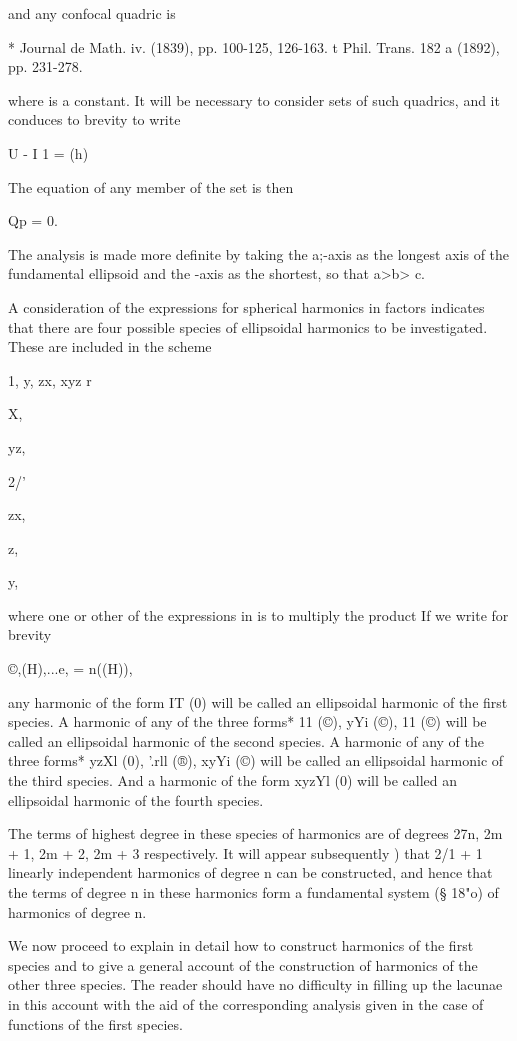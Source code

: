 and any confocal quadric is

* Journal de Math. iv. (1839), pp. 100-125, 126-163. t Phil. Trans.
182 a (1892), pp. 231-278.

%
%

where is a constant. It will be necessary to consider sets of such
quadrics, and it conduces to brevity to write

U - I 1 = (h)

The equation of any member of the set is then

Qp = 0.

The analysis is made more definite by taking the a;-axis as the
longest axis of the fundamental ellipsoid and the -axis as the
shortest, so that a>b> c.


A consideration of the expressions for spherical harmonics in factors
indicates that there are four possible species of ellipsoidal
harmonics to be investigated. These are included in the scheme

1, y, zx, xyz r%

X,

yz,

2/'

zx,

z,

 y,

where one or other of the expressions in is to multiply the product If
we write for brevity

©,(H),...e, = n((H)),

any harmonic of the form IT (0) will be called an ellipsoidal harmonic
of the first species. A harmonic of any of the three forms* 11 (©),
yYi (©), 11 (©) will be called an ellipsoidal harmonic of the second
species. A harmonic of any of the three forms* yzXl (0), '.rll (®),
xyYi (©) will be called an ellipsoidal harmonic of the third species.
And a harmonic of the form xyzYl (0) will be called an ellipsoidal
harmonic of the fourth species.

The terms of highest degree in these species of harmonics are of
degrees 27n, 2m + 1, 2m + 2, 2m + 3 respectively. It will appear
subsequently ) that 2/1 + 1 linearly independent harmonics of
degree n can be constructed, and hence that the terms of degree n in
these harmonics form a fundamental system (§ 18"o) of harmonics of
degree n.

We now proceed to explain in detail how to construct harmonics of the
first species and to give a general account of the construction of
harmonics of the other three species. The reader should have no
difficulty in filling up the lacunae in this account with the aid of
the corresponding analysis given in the case of functions of the first
species.

